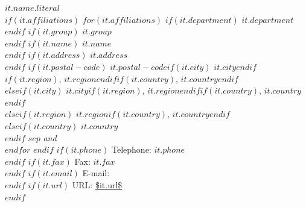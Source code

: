 $it.name.literal$\\
$if(it.affiliations)$
$for(it.affiliations)$
$if(it.department)$
$it.department$\\
$endif$
$if(it.group)$
$it.group$\\
$endif$
$if(it.name)$
$it.name$\\
$endif$
$if(it.address)$
$it.address$\\
$endif$
$if(it.postal-code)$
$it.postal-code$$if(it.city)$ $it.city$$endif$$if(it.region)$, $it.region$$endif$$if(it.country)$, $it.country$$endif$\\
$elseif(it.city)$
$it.city$$if(it.region)$, $it.region$$endif$$if(it.country)$, $it.country$$endif$\\
$elseif(it.region)$
$it.region$$if(it.country)$, $it.country$$endif$\\
$elseif(it.country)$
$it.country$\\
$endif$
$sep$
\emph{and}\\
$endfor$
$endif$
$if(it.phone)$
Telephone: $it.phone$\\
$endif$
$if(it.fax)$
Fax: $it.fax$\\
$endif$
$if(it.email)$
E-mail: \\
$endif$
$if(it.url)$
URL: \url{$it.url$}\\
$endif$
\\~

